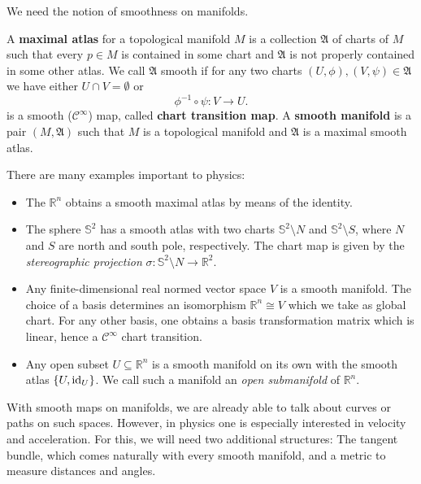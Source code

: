 We need the notion of smoothness on manifolds.
\begin{definition}
    A \textbf{maximal atlas} for a topological manifold $M$ is a collection $\mathfrak{A}$ of charts of $M$ such that every $p \in M$ is contained in some chart and $\mathfrak{A}$ is not properly contained in some other atlas. We call $\mathfrak{A}$ smooth if for any two charts $(U,\phi),(V,\psi) \in \mathfrak{A}$ we have either $U \cap V = \emptyset$ or \[
        \phi^{-1} \circ \psi: V \to U
    .\] is a smooth ($\mathcal{C}^\infty$) map, called \textbf{chart transition map}. A \textbf{smooth manifold} is a pair $(M, \mathfrak{A})$ such that $M$ is a topological manifold and $\mathfrak{A}$ is a maximal smooth atlas.
\end{definition}
There are many examples important to physics:
\begin{eg}
    \begin{itemize}
        \item The $\mathbb{R}^n$ obtains a smooth maximal atlas by means of the identity.
        \item The sphere $\mathbb{S}^2$ has a smooth atlas with two charts $\mathbb{S}^2 \setminus N$ and $\mathbb{S}^2 \setminus S$, where $N$ and $S$ are north and south pole, respectively. The chart map is given by the \emph{stereographic projection} $\sigma: \mathbb{S}^2 \setminus N \to \mathbb{R}^2$. 
        \item Any finite-dimensional real normed vector space $V$ is a smooth manifold. The choice of a basis determines an isomorphism $\mathbb{R}^n \cong V$ which we take as global chart. For any other basis, one obtains a basis transformation matrix which is linear, hence a $\mathcal{C}^\infty$ chart transition.
        \item Any open subset $U \subseteq \mathbb{R}^n$ is a smooth manifold on its own with the smooth atlas $\{U, \operatorname{id}_U\}$. We call such a manifold an \emph{open submanifold} of $\mathbb{R}^n$.
    \end{itemize}
\end{eg}
With smooth maps on manifolds, we are already able to talk about curves or paths on such spaces. However, in physics one is especially interested in velocity and acceleration. For this, we will need two additional structures: The tangent bundle, which comes naturally with every smooth manifold, and a metric to measure distances and angles.

